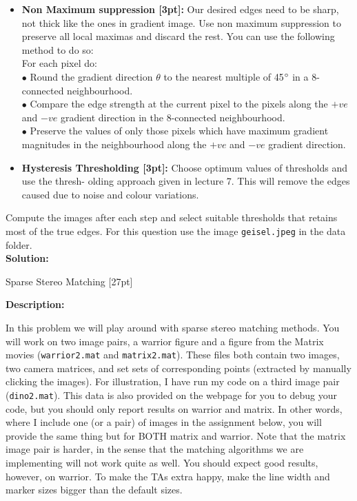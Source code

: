 \documentclass{assignment}
\begin{document}
\begin{problemlist}
\begin{itemize}
    \item\textbf{Non Maximum suppression [3pt]:}
    Our desired edges need to be sharp, not thick like the ones in gradient image. Use non maximum suppression to preserve all local maximas and discard the rest. You can use the following method to do so:\\
    For each pixel do:\\
    $\bullet$ Round the gradient direction $\theta$ to the nearest multiple of 45$\degree$ in a 8-connected neighbourhood.\\
    $\bullet$ Compare the edge strength at the current pixel to the pixels along the $+ve$ and $−ve$ gradient direction in the 8-connected neighbourhood.\\
    $\bullet$ Preserve the values of only those pixels which have maximum gradient magnitudes in the neighbourhood along the $+ve$ and $−ve$ gradient direction.\\
        
    \item\textbf{Hysteresis Thresholding [3pt]:}
    Choose optimum values of thresholds and use the thresh- olding approach given in lecture 7. This will remove the edges caused due to noise and colour variations.
\end{itemize}
Compute the images after each step and select suitable thresholds that retains most of the true edges. For this question use the image \texttt{geisel.jpeg} in the data folder.\\

\textbf{Solution:}

\newpage
\pbitem Sparse Stereo Matching [27pt]

\textbf{Description:}

In this problem we will play around with sparse stereo matching methods. You will work on two image pairs, a warrior figure and a figure from the Matrix movies (\texttt{warrior2.mat} and \texttt{matrix2.mat}). These files both contain two images, two camera matrices, and set sets of corresponding points (extracted by manually clicking the images). For illustration, I have run my code on a third image pair (\texttt{dino2.mat}). This data is also provided on the webpage for you to debug your code, but you should only report results on warrior and matrix. In other words, where I include one (or a pair) of images in the assignment below, you will provide the same thing but for BOTH matrix and warrior. Note that the matrix image pair is harder, in the sense that the matching algorithms we are implementing will not work quite as well. You should expect good results, however, on warrior. To make the TAs extra happy, make the line width and marker sizes bigger than the default sizes.\\


\end{problemlist}
\end{document}

